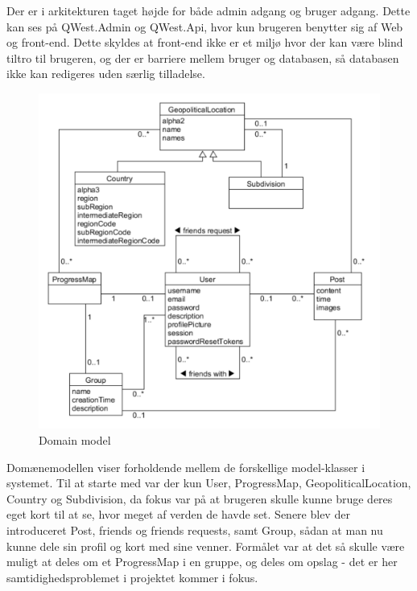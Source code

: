 Der er i arkitekturen taget højde for både admin adgang og bruger adgang. Dette kan ses på QWest.Admin og QWest.Api, hvor kun brugeren benytter sig af Web og front-end. Dette skyldes at front-end ikke er et miljø hvor der kan være blind tiltro til brugeren, og der er barriere mellem bruger og databasen, så databasen ikke kan redigeres uden særlig tilladelse. 

\begin{figure}
    \includegraphics[width=\linewidth]{figures/Domain.png}
    \caption{Domain model}
    \label{fig:Domain}
\end{figure}

Domænemodellen viser forholdende mellem de forskellige model-klasser i systemet. Til at starte med var der kun User, ProgressMap, GeopoliticalLocation, Country og Subdivision, da fokus var på at brugeren skulle kunne bruge deres eget kort til at se, hvor meget af verden de havde set. Senere blev der introduceret Post, friends og friends requests, samt Group, sådan at man nu kunne dele sin profil og kort med sine venner. 
Formålet var at det så skulle være muligt at deles om et ProgressMap i en gruppe, og deles om opslag - det er her samtidighedsproblemet i projektet kommer i fokus.

